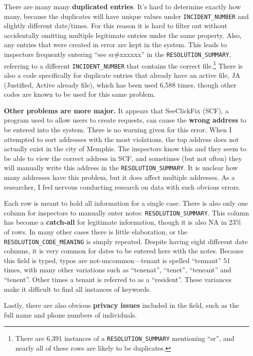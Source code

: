 \documentclass[
]{book}
\begin{document}
There are many many \textbf{duplicated entries}. It's hard to determine exactly how many, because the duplicates will have unique values under \texttt{INCIDENT\_NUMBER} and slightly different date/times. For this reason it is hard to filter out without accidentally omitting multiple legitimate entries under the same property. Also, any entries that were created in error are kept in the system. This leads to inspectors frequently entering ``see sr\#xxxxxx'' in the \texttt{RESOLUTION\_SUMMARY}, referring to a different \texttt{INCIDENT\_NUMBER} that contains the correct file.\footnote{There are 6,391 instances of a \texttt{RESOLUTION\_SUMMARY} mentioning ``sr'', and nearly all of these rows are likely to be duplicates.} There is also a code specifically for duplicate entries that already have an active file, JA (Justified, Active already file), which has been used 6,588 times, though other codes are known to be used for this same problem.

\textbf{Other problems are more major.} It appears that SeeClickFix (SCF), a program used to allow users to create requests, can cause the \textbf{wrong address} to be entered into the system. There is no warning given for this error. When I attempted to sort addresses with the most violations, the top address does not actually exist in the city of Memphis. The inspectors know this and they seem to be able to view the correct address in SCF, and sometimes (but not often) they will manually write this address in the \texttt{RESOLUTION\_SUMMARY}. It is unclear how many addresses have this problem, but it does affect multiple addresses. As a researcher, I feel nervous conducting research on data with such obvious errors.

Each row is meant to hold all information for a single case. There is also only one column for inspectors to manually enter notes: \texttt{RESOLUTION\_SUMMARY}. This column has become a \textbf{catch-all} for legitimate information, though it is also NA in 23\% of rows. In many other cases there is little elaboration, or the \texttt{RESOLUTION\_CODE\_MEANING} is simply repeated. Despite having eight different date columns, it is very common for dates to be entered here with the notes. Because this field is typed, typos are not-uncommon---tenant is spelled ``tennant'' 51 times, with many other variations such as ``tenenat'', ``tenet'', ``teneant'' and ``tenent''. Other times a tenant is referred to as a ``resident''. These variances make it difficult to find all instances of keywords.

Lastly, there are also obvious \textbf{privacy issues} included in the field, such as the full name and phone numbers of individuals.
\end{document}
